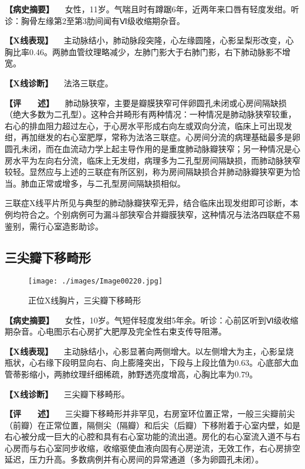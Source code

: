 \textbf{【病史摘要】}
　女性，11岁。气喘且时有蹲踞6年，近两年来口唇有轻度发绀。听诊：胸骨左缘第2至第3肋间闻有Ⅵ级收缩期杂音。

\textbf{【X线表现】}
　主动脉结小，肺动脉段突隆，心左缘圆隆，心影呈梨形改变，心胸比率0.46。两肺血管纹理略减少，左肺门影大于右肺门影，右下肺动脉影不增宽。

\textbf{【X线诊断】} 　法洛三联症。

\textbf{【评　　述】}
　肺动脉狭窄，主要是瓣膜狭窄可伴卵圆孔未闭或心房间隔缺损（绝大多数为二孔型）。这种合并畸形有两种情况：一种情况是肺动脉狭窄较重，右心的排血阻力超过左心，于心房水平形成右向左或双向分流，临床上可出现发绀，再加继发的右心室肥厚，常称为法洛三联症。心房间分流的病理基础最多是卵圆孔未闭，而在血流动力学上起主导作用的是重度肺动脉瓣狭窄；另一种情况是心房水平为左向右分流，临床上无发绀，病理多为二孔型房间隔缺损，而肺动脉狭窄较轻。显然应与上述的三联症有所区别，称为房间隔缺损合并肺动脉瓣狭窄更为恰当。肺血正常或增多，与二孔型房间隔缺损相似。

三联症X线平片所见与典型的肺动脉瓣狭窄无异，结合临床出现发绀即可诊断，本例均符合之。个别病例可为漏斗部狭窄合并瓣膜狭窄，这种情况与法洛四联症不易鉴别，需行心室造影助诊。

\subsection{三尖瓣下移畸形}

\begin{figure}[!htbp]
 \centering
 \texttt{[image: ./images/Image00220.jpg]}
 \captionsetup{justification=centering}
 \caption{正位X线胸片，三尖瓣下移畸形}
 \label{fig4-2-7}
  \end{figure} 

\textbf{【病史摘要】}
　女性，10岁。气短伴轻度发绀5年余。听诊：心前区听到Ⅵ级收缩期杂音。心电图示右心房扩大肥厚及完全性右束支传导阻滞。

\textbf{【X线表现】}
　主动脉结小，心影显著向两侧增大。以左侧增大为主，心影呈烧瓶状，心右缘下段明显向右、向上膨隆突出，下段与上段比值为0.63。心底部大血管蒂影缩小，两肺纹理纤细稀疏，肺野透亮度增高，心胸比率为0.79。

\textbf{【X线诊断】} 　三尖瓣下移畸形。

\textbf{【评　　述】}
　三尖瓣下移畸形并非罕见，右房室环位置正常，一般三尖瓣前尖（前瓣）在正常位置，隔侧尖（隔瓣）和后尖（后瓣）下移附着于心室内壁，如是右心被分成一巨大的心腔和具有右心室功能的流出道。房化的右心室流入道不与右心房而与右心室同步收缩，收缩驱使血液向固有心房逆流，无效工作，右心房排空延迟，压力升高。多数病例并有心房间的异常通道（多为卵圆孔未闭）。

